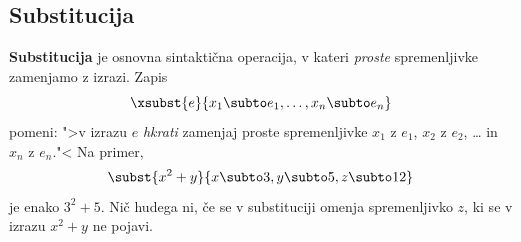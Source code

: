 \subsection{Substitucija}
\label{sec:substitucija}

\textbf{Substitucija} je osnovna sintaktična operacija, v kateri
\emph{proste} spremenljivke zamenjamo z izrazi. Zapis
%
\begin{equation*}
  \xsubst{e}{x_1 \subto e_1, \ldots, x_n \subto e_n}
\end{equation*}
%
pomeni: ">v izrazu $e$ \emph{hkrati} zamenjaj proste spremenljivke
$x_1$ z $e_1$, $x_2$ z $e_2$, \dots{} in $x_n$ z $e_n$."<  Na primer,
%
\begin{equation*}
  \subst{x^2 + y}{x \subto 3, y \subto 5, z \subto 12}
\end{equation*}
%
je enako $3^2 + 5$. Nič hudega ni, če se v substituciji omenja
spremenljivko $z$, ki se v izrazu $x^2 + y$ ne pojavi.

